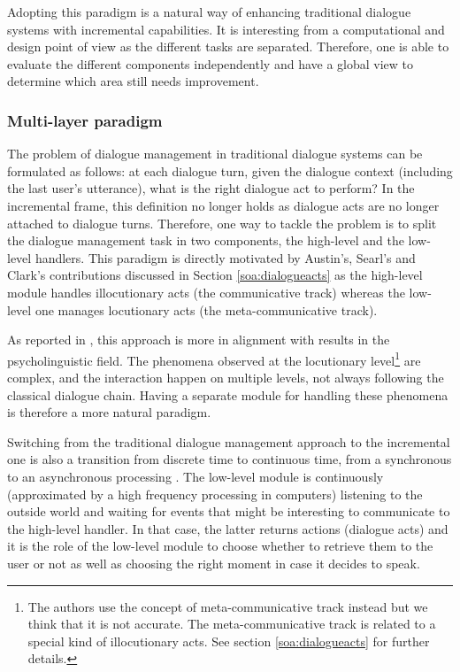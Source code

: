 			Adopting this paradigm is a natural way of enhancing traditional dialogue systems with incremental capabilities. It is interesting from a computational and design point of view as the different tasks are separated. Therefore, one is able to evaluate the different components independently \cite{Baumann2011} and have a global view to determine which area still needs improvement.

		\subsubsection{Multi-layer paradigm}
		
			The problem of dialogue management in traditional dialogue systems can be formulated as follows: at each dialogue turn, given the dialogue context (including the last user's utterance), what is the right dialogue act to perform? In the incremental frame, this definition no longer holds as dialogue acts are no longer attached to dialogue turns. Therefore, one way to tackle the problem is to split the dialogue management task in two components, the high-level and the low-level handlers. This paradigm is directly motivated by Austin's, Searl's and Clark's contributions discussed in Section \ref{soa:dialogueacts} as the high-level module handles illocutionary acts (the communicative track) whereas the low-level one manages locutionary acts (the meta-communicative track).
				
				As reported in \cite{Lemon2003}, this approach is more in alignment with results in the psycholinguistic field. The phenomena observed at the locutionary level\footnote{The authors use the concept of meta-communicative track instead but we think that it is not accurate. The meta-communicative track is related to a special kind of illocutionary acts. See section \ref{soa:dialogueacts} for further details.} are complex, and the interaction happen on multiple levels, not always following the classical dialogue chain. Having a separate module for handling these phenomena is therefore a more natural paradigm.
				
				Switching from the traditional dialogue management approach to the incremental one is also a transition from discrete time to continuous time, from a synchronous to an asynchronous processing \cite{Raux2007}. The low-level module is continuously (approximated by a high frequency processing in computers) listening to the outside world and waiting for events that might be interesting to communicate to the high-level handler. In that case, the latter returns actions (dialogue acts) and it is the role of the low-level module to choose whether to retrieve them to the user or not as well as choosing the right moment in case it decides to speak.
				
